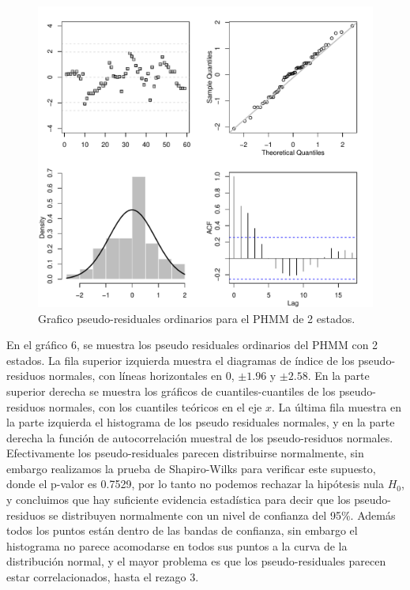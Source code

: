 \documentclass[a4paper]{article}\usepackage[]{graphicx}\usepackage[]{color}
\makeatletter
\def\maxwidth{ %
  \ifdim\Gin@nat@width>\linewidth
    \linewidth
  \else
    \Gin@nat@width
  \fi
}
\newenvironment{knitrout}{}{} %
\makeatother
\begin{document}
\begin{knitrout}
\color{fgcolor}\begin{figure}[h]
\includegraphics[width=\maxwidth]{figure/unnamed-chunk-17-1} \caption[Grafico pseudo-residuales ordinarios para el PHMM de 2 estados]{Grafico pseudo-residuales ordinarios para el PHMM de 2 estados.}\label{fig:unnamed-chunk-17}
\end{figure}


\end{knitrout}

En el gráfico 6, se muestra los pseudo residuales ordinarios del PHMM con 2 estados. La fila superior izquierda muestra el diagramas de índice de los pseudo-residuos normales, con líneas horizontales en 0, $\pm 1.96$ y $\pm 2.58$. En la parte superior derecha se muestra los gráficos de cuantiles-cuantiles de los pseudo-residuos normales, con los cuantiles teóricos en el eje $x$. La última fila muestra en la parte izquierda el histograma de los pseudo residuales normales, y en la parte derecha la función de autocorrelación muestral de los pseudo-residuos normales. Efectivamente los pseudo-residuales parecen distribuirse normalmente, sin embargo realizamos la prueba de Shapiro-Wilks para verificar este supuesto, donde el p-valor es 0.7529, por lo tanto no podemos rechazar la hipótesis nula $H_0$, y concluimos que hay suficiente evidencia estadística para decir que los pseudo-residuos se distribuyen normalmente con un nivel de confianza del 95\%. Además todos los puntos están dentro de las bandas de confianza, sin embargo el histograma no parece acomodarse en todos sus puntos a la curva de la distribución normal, y el mayor problema es que los pseudo-residuales parecen estar correlacionados, hasta el rezago 3.
\end{document}
